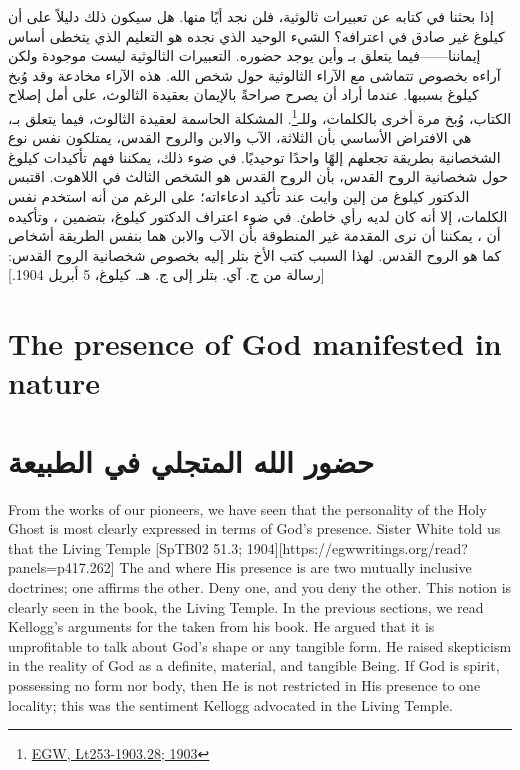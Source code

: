 إذا بحثنا في كتابه عن تعبيرات ثالوثية، فلن نجد أيًا منها. هل سيكون ذلك دليلاً على أن كيلوغ غير صادق في اعترافه؟ الشيء الوحيد الذي نجده هو التعليم الذي يتخطى أساس إيماننا——فيما يتعلق بـ وأين يوجد حضوره. التعبيرات الثالوثية ليست موجودة ولكن آراءه بخصوص  تتماشى مع الآراء الثالوثية حول شخص الله. هذه الآراء مخادعة وقد وُبخ كيلوغ بسببها. عندما أراد أن يصرح صراحةً بالإيمان بعقيدة الثالوث، على أمل إصلاح الكتاب، وُبخ مرة أخرى بالكلمات،  وللـ\footnote{\href{https://egwwritings.org/?ref=en_Lt253-1903.28&para=9980.36}{EGW, Lt253-1903.28; 1903}}. المشكلة الحاسمة لعقيدة الثالوث، فيما يتعلق بـ، هي الافتراض الأساسي بأن الثلاثة، الآب والابن والروح القدس، يمتلكون نفس نوع الشخصانية بطريقة تجعلهم إلهًا واحدًا توحيديًا. في ضوء ذلك، يمكننا فهم تأكيدات كيلوغ حول شخصانية الروح القدس، بأن الروح القدس هو الشخص الثالث في اللاهوت. اقتبس الدكتور كيلوغ من إلين وايت عند تأكيد ادعاءاته؛ على الرغم من أنه استخدم نفس الكلمات، إلا أنه كان لديه رأي خاطئ. في ضوء اعتراف الدكتور كيلوغ، بتضمين ، وتأكيده أن ، يمكننا أن نرى المقدمة غير المنطوقة بأن الآب والابن هما بنفس الطريقة أشخاص كما هو الروح القدس. لهذا السبب كتب الأخ بتلر إليه بخصوص شخصانية الروح القدس: [رسالة من ج. آي. بتلر إلى ج. هـ. كيلوغ، 5 أبريل 1904.]


\section*{The presence of God manifested in nature}


\section*{حضور الله المتجلي في الطبيعة}


From the works of our pioneers, we have seen that the personality of the Holy Ghost is most clearly expressed in terms of God's presence. Sister White told us that the Living Temple [SpTB02 51.3; 1904][https://egwwritings.org/read?panels=p417.262] The  and where His presence is are two mutually inclusive doctrines; one affirms the other. Deny one, and you deny the other. This notion is clearly seen in the book, the Living Temple. In the previous sections, we read Kellogg's arguments for the  taken from his book. He argued that it is unprofitable to talk about God's shape or any tangible form. He raised skepticism in the reality of God as a definite, material, and tangible Being. If God is spirit, possessing no form nor body, then He is not restricted in His presence to one locality; this was the sentiment Kellogg advocated in the Living Temple.



